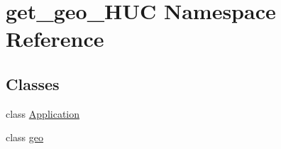 \hypertarget{namespaceget__geo___h_u_c}{}\section{get\+\_\+geo\+\_\+\+H\+UC Namespace Reference}
\label{namespaceget__geo___h_u_c}
\subsection*{Classes}
\begin{DoxyCompactItemize}
\item 
class \hyperlink{classget__geo___h_u_c_1_1_application}{Application}
\item 
class \hyperlink{classget__geo___h_u_c_1_1geo}{geo}
\end{DoxyCompactItemize}
